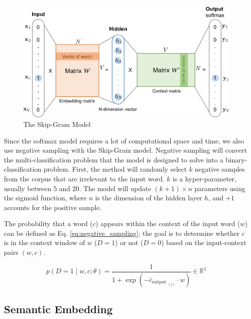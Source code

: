 \begin{figure}[h]
	\centering
	\includegraphics[scale=0.4]{../images/skip-gram.png}
    \caption[The Skip-Gram Model]{The Skip-Gram Model\protect\footnotemark}
	\label{fig:skip-gram}
\end{figure}


Since the softmax model requires a lot of computational space and time, we also use negative sampling with the Skip-Gram model. Negative sampling will convert the multi-classification problem that the model is designed to solve into a binary-classification problem. First, the method will randomly select $k$ negative samples from the corpus that are irrelevant to the input word. $k$ is a hyper-parameter, usually between 5 and 20. The model will update $(k+1)\times n$ parameters using the sigmoid function, where $n$ is the dimension of the hidden layer $h$, and $+1$ accounts for the positive sample.

The probability that a word ($c$) appears within the context of the input word ($w$) can be defined as Eq. \ref{eq:negative_sampling}; the goal is to determine whether $c$ is in the context window of $w$ ($D=1$) or not ($D=0$) based on the input-context pairs $(w, c)$.

\begin{equation}
p(D=1 \mid w, c ; \theta)=\frac{1}{1+\exp \left(-\bar{c}_{\text {output }_{(j)}} \cdot w\right)} \in \mathbb{R}^{1} \label{eq:negative_sampling}
\end{equation}

\subsection{Semantic Embedding}

